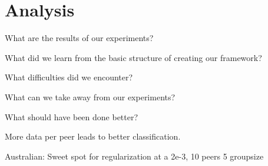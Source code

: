 
\chapter{Analysis}

What are the results of our experiments?

What did we learn from the basic structure of creating our framework?

What difficulties did we encounter?

What can we take away from our experiments?

What should have been done better? 

More data per peer leads to better classification.

Australian: Sweet spot for regularization at a 2e-3, 10 peers 5 groupsize


\cleardoublepage